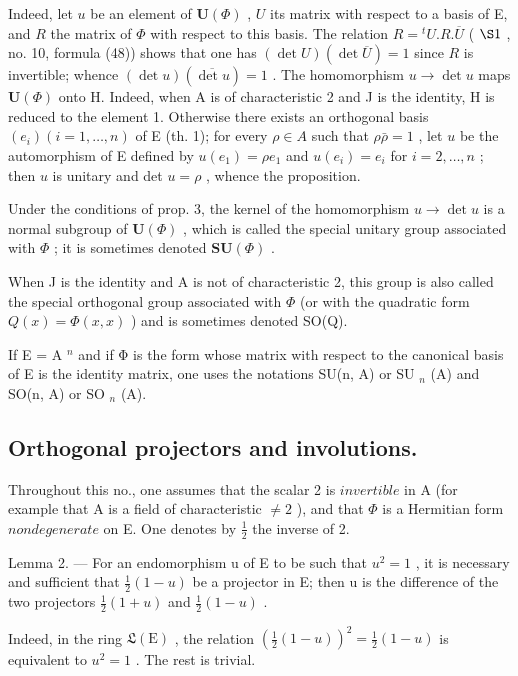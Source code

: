 Indeed, let \(u\) be an element of \(\mathbf{U}(\Phi)\) , \(U\) its matrix with respect to a basis of E, and \(R\) the matrix of \(\Phi\) with respect to this basis. The relation \(R = {}^t U.R.\overline{U}\) ( \(\S 1\) , no. 10, formula (48)) shows that one has \((\det U)(\det \overline{U}) = 1\) since \(R\) is invertible; whence \((\det u)(\overline{\det u}) = 1\) . The homomorphism \(u \to \det u\) maps \(\mathbf{U}(\Phi)\) onto H. Indeed, when A is of characteristic 2 and J is the identity, H is reduced to the element 1. Otherwise there exists an orthogonal basis \((e_i)(i = 1,\ldots,n)\) of E (th. 1); for every \(\rho \in A\) such that \(\rho \bar{\rho} = 1\) , let \(u\) be the automorphism of E defined by \(u(e_1) = \rho e_1\) and \(u(e_i) = e_i\) for \(i = 2,\ldots,n\) ; then \(u\) is unitary and det \(u = \rho\) , whence the proposition.

Under the conditions of prop. 3, the kernel of the homomorphism \(u \to \det u\) is a normal subgroup of \(\mathbf{U}(\Phi)\) , which is called the special unitary group associated with \(\Phi\) ; it is sometimes denoted \(\mathbf{SU}(\Phi)\) .

When J is the identity and A is not of characteristic 2, this group is also called the special orthogonal group associated with \(\Phi\) (or with the quadratic form \(Q(x) = \Phi(x, x)\) ) and is sometimes denoted SO(Q).

If E = A \(^{n}\) and if Φ is the form whose matrix with respect to the canonical basis of E is the identity matrix, one uses the notations SU(n, A) or SU \(_{n}\) (A) and SO(n, A) or SO \(_{n}\) (A).

\subsection{Orthogonal projectors and involutions.}

Throughout this no., one assumes that the scalar 2 is \(invertible\) in A (for example that A is a field of characteristic \(\neq 2\) ), and that \(\Phi\) is a Hermitian form \(nondegenerate\) on E. One denotes by \(\frac{1}{2}\) the inverse of 2.

Lemma 2. --- For an endomorphism u of E to be such that \(u^{2}=1\) , it is necessary and sufficient that \(\frac{1}{2}(1-u)\) be a projector in E; then u is the difference of the two projectors \(\frac{1}{2}(1+u)\) and \(\frac{1}{2}(1-u)\) .

Indeed, in the ring \(\mathfrak{L}(\mathrm{E})\) , the relation \(\left(\frac{1}{2}(1 - u)\right)^2 = \frac{1}{2}(1 - u)\) is equivalent to \(u^2 = 1\) . The rest is trivial.

